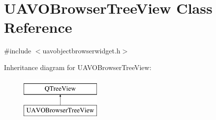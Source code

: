 \hypertarget{class_u_a_v_o_browser_tree_view}{\section{U\-A\-V\-O\-Browser\-Tree\-View Class Reference}
\label{class_u_a_v_o_browser_tree_view}
}


{\ttfamily \#include $<$uavobjectbrowserwidget.\-h$>$}

Inheritance diagram for U\-A\-V\-O\-Browser\-Tree\-View\-:\begin{figure}[H]
\begin{center}
\leavevmode
\includegraphics[height=2.000000cm]{class_u_a_v_o_browser_tree_view}
\end{center}
\end{figure}
